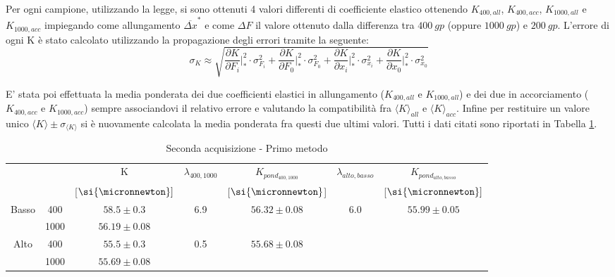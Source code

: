 \documentclass[a4paper,11pt,oneside]{article}
\begin{document}
Per ogni campione, utilizzando la legge, si sono ottenuti 4 valori differenti di coefficiente elastico ottenendo $K_{400, all}$, $K_{400, acc}$, $K_{1000, all}$ e $K_{1000, acc}$ impiegando come allungamento ${\overline{\Delta x}}^\ast$ e come $\Delta F$ il valore ottenuto dalla differenza tra $\SI{400}{gp}$ (oppure $\SI{1000}{gp} $) e $ \SI{200}{gp}$. L'errore di ogni K è stato calcolato utilizzando la propagazione degli errori tramite la seguente:
\begin{equation*}
\sigma_K \approx \sqrt{ \frac{\partial K }{\partial F_i} \Big|_{\ast}^2 \cdot  \sigma_{ F_i}^2 +
\frac{\partial K }{\partial F_0} \Big|_{\ast}^2\cdot  \sigma_{ F_0}^2 +
 \frac{\partial K }{\partial x_i}\Big|_{\ast}^2 \cdot  \sigma_{x_i}^2 +
 \frac{\partial K }{\partial x_0}\Big|_{\ast}^2\cdot  \sigma_{x_0} ^2 }
\end{equation*}

E' stata poi effettuata la media ponderata dei due coefficienti elastici in allungamento ($K_{400, all}$ e $K_{1000, all}$) e dei due in accorciamento ($K_{400, acc}$ e $K_{1000, acc}$) sempre associandovi il relativo errore e valutando la compatibilità fra ${\langle K \rangle}_{all}$ e ${\langle K \rangle}_{acc}$. Infine per restituire un valore unico $\langle K \rangle \pm \sigma_{\langle K \rangle}$ si è nuovamente calcolata la media ponderata fra questi due ultimi valori. Tutti i dati citati sono riportati in Tabella \ref{tab:2ac_1metodo}.\\


\begin{table}[h!]
\centering
\caption{Seconda acquisizione - Primo metodo}
\label{tab:2ac_1metodo}

    \begin{tabular}{|c|c|c|c||c|c|c|}
        \hline
        \multicolumn{2}{|c|}{}  & K &  \multirow{2}{*}{$\lambda_{400, 1000}$} & $K_{pond_{400, 1000}}$ & \multirow{2}{*}{$\lambda_{alto, basso}$}  & $K_{pond_{alto, basso}}$ \\
        \multicolumn{2}{|c|}{}  & [$\si{\micronnewton}]$ && [$\si{\micronnewton}$] && [$\si{\micronnewton}]$ \\\hline
        \multirow{2}{*}{Basso} & {\cellcolor[rgb]{0.85,0.85,0.85}}400  & {\cellcolor[rgb]{0.85,0.85,0.85}}$58.5\pm0.3$  & \multirow{2}{*}{6.9}   & \multirow{2}{*}{$56.32\pm0.08$} & \multirow{4}{*}{6.0} & \multirow{4}{*}{$55.99\pm0.05$} \\\cline{2-3}
        & 1000 & $56.19\pm0.08$ &  &  &  & \\\cline{1-5}
        \multirow{2}{*}{Alto}  & {\cellcolor[rgb]{0.85,0.85,0.85}}400  & {\cellcolor[rgb]{0.85,0.85,0.85}}$55.5\pm0.3$  & \multirow{2}{*}{0.5} & \multirow{2}{*}{$55.68\pm0.08$} & & \\\cline{2-3}
        & 1000 & $55.69\pm0.08$ &  &  &  &\\ \hline 
    \end{tabular}
\end{table}
\end{document}
